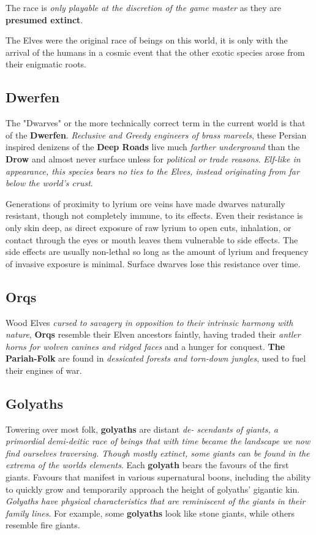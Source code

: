 \documentclass{apotheosis-book}
\begin{document}
The race is \textit{only playable at the discretion of the game master} as they are \textbf{presumed extinct}.

\begin{DndReadAloud}
   The Elves were the original race of beings on this world, it is only with the arrival of the humans in a cosmic event that the other exotic species arose from their enigmatic roots.
\end{DndReadAloud}

\subsection{Dwerfen}
The "Dwarves" or the more technically correct term in the current world is that of the \textbf{Dwerfen}. \textit{Reclusive and Greedy engineers of brass marvels}, these Persian inspired denizens of the \textbf{Deep Roads} live much \textit{farther underground} than the \textbf{Drow} and almost never surface unless for \textit{political or trade reasons}. \textit{Elf-like in appearance, this species bears no ties to the Elves, instead originating from far below the world's crust}.

Generations of proximity to lyrium ore veins have made dwarves naturally resistant, though not completely immune, to its effects. Even their resistance is only skin deep, as direct exposure of raw lyrium to open cuts, inhalation, or contact through the eyes or mouth leaves them vulnerable to side effects. The side effects are usually non-lethal so long as the amount of lyrium and frequency of invasive exposure is minimal. Surface dwarves lose this resistance over time.

\subsection{Orqs}
Wood Elves \textit{cursed to savagery in opposition to their intrinsic harmony with nature}, \textbf{Orqs} resemble their Elven ancestors faintly, having traded their \textit{antler horns for wolven canines and ridged faces} and a hunger for conquest.\textbf{ The Pariah-Folk} are found in \textit{dessicated forests and torn-down jungles}, used to fuel their engines of war.

\subsection{Golyaths}
Towering over most folk, \textbf{golyaths} are distant \textit{de-
scendants
of
giants, a primordial demi-deitic race of beings that with time became the landscape we now find ourselves traversing. Though mostly extinct, some giants can be found in the extrema of the worlds elements}. Each \textbf{golyath} bears the favours
of
the first
giants. Favours that
manifest in various
supernatural boons, including the ability to quickly
grow and temporarily approach the height
of
golyaths' gigantic kin.
\textit{Golyaths have physical characteristics that are
reminiscent
of
the giants in their family lines}. For
example, some \textbf{golyaths} look like stone giants, while
others resemble fire giants.
\end{document}
